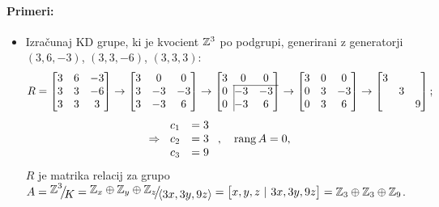 \paragraph{Primeri:}
\begin{itemize}
	\item{Izra\v cunaj KD grupe, ki je kvocient $\mathbb{Z}^3$ po podgrupi, generirani z generatorji $(3,6,-3)$, $(3,3,-6)$, $(3,3,3)$:
		\[
			R = \begin{bmatrix}
				3 & 6 & -3 \\
				3 & 3 & -6 \\
				3 & 3 & 3
			\end{bmatrix} \to \begin{bmatrix}
				3 & 0  & 0  \\
				3 & -3 & -3 \\
				3 & -3 & 6
			\end{bmatrix} \to \begin{bmatrix}
				3 & 0 & 0 \\
				\cline{2-3}
				0 &\hspace{-1ex}\vline -3 & -3 \\
				0 &\hspace{-1ex}\vline -3 & 6
			\end{bmatrix} \to \begin{bmatrix}
				3 & 0 & 0 \\
				0 & 3 & -3\\
				0 & 3 & 6
			\end{bmatrix} \to \begin{bmatrix}
				3 &   & \\
				  & 3 & \\
				  &   & 9
			\end{bmatrix};
		\]
		\[
			\Rightarrow
			\left.
			\begin{array}{rl}
				c_1 &= 3\\
				c_2 &= 3\\
				c_3 &= 9
			\end{array}\right.,\quad \operatorname{rang} A = 0,
		\]
		$R$ je matrika relacij za grupo $A = \quot{\Z^3}{K} = \quot{\Z_x \oplus \Z_y \oplus \Z_z}{\langle3x, 3y, 9z \rangle} =
		\big[x,y,z\ |\ 3x, 3y, 9z\big] = \Z_3 \oplus \Z_3 \oplus \Z_9$.
}
\end{itemize}
